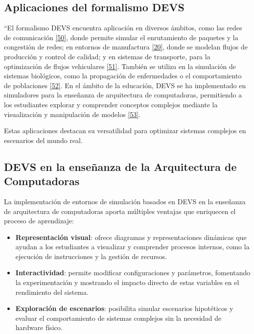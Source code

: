\documentclass[12pt,oneside]{templates/unerthesis}
\providecommand{\tightlist}{%
  \setlength{\itemsep}{0pt}\setlength{\parskip}{0pt}}
\begin{document}
\hypertarget{aplicaciones-del-formalismo-devs}{%
\subsection{Aplicaciones del formalismo DEVS}\label{aplicaciones-del-formalismo-devs}}

``El formalismo DEVS encuentra aplicación en diversos ámbitos, como las redes de comunicación \protect\hyperlink{ref-fujimoto2001parallel}{{[}50{]}}, donde permite simular el enrutamiento de paquetes y la congestión de redes; en entornos de manufactura \protect\hyperlink{ref-zeigler_theory_2000}{{[}20{]}}, donde se modelan flujos de producción y control de calidad; y en sistemas de transporte, para la optimización de flujos vehiculares \protect\hyperlink{ref-barros1997modeling}{{[}51{]}}. También se utiliza en la simulación de sistemas biológicos, como la propagación de enfermedades o el comportamiento de poblaciones \protect\hyperlink{ref-zeigler2004continuity}{{[}52{]}}. En el ámbito de la educación, DEVS se ha implementado en simuladores para la enseñanza de arquitectura de computadoras, permitiendo a los estudiantes explorar y comprender conceptos complejos mediante la visualización y manipulación de modelos \protect\hyperlink{ref-calvo2010simulador}{{[}53{]}}.

Estas aplicaciones destacan su versatilidad para optimizar sistemas complejos en escenarios del mundo real.

\hypertarget{devs-en-la-enseuxf1anza-de-la-arquitectura-de-computadoras}{%
\subsection{DEVS en la enseñanza de la Arquitectura de Computadoras}\label{devs-en-la-enseuxf1anza-de-la-arquitectura-de-computadoras}}

La implementación de entornos de simulación basados en DEVS en la enseñanza de arquitectura de computadoras aporta múltiples ventajas que enriquecen el proceso de aprendizaje:

\begin{itemize}
\tightlist
\item
  \textbf{Representación visual}: ofrece diagramas y representaciones dinámicas que ayudan a los estudiantes a visualizar y comprender procesos internos, como la ejecución de instrucciones y la gestión de recursos.
\item
  \textbf{Interactividad}: permite modificar configuraciones y parámetros, fomentando la experimentación y mostrando el impacto directo de estas variables en el rendimiento del sistema.
\item
  \textbf{Exploración de escenarios}: posibilita simular escenarios hipotéticos y evaluar el comportamiento de sistemas complejos sin la necesidad de hardware físico.
\end{itemize}
\end{document}
